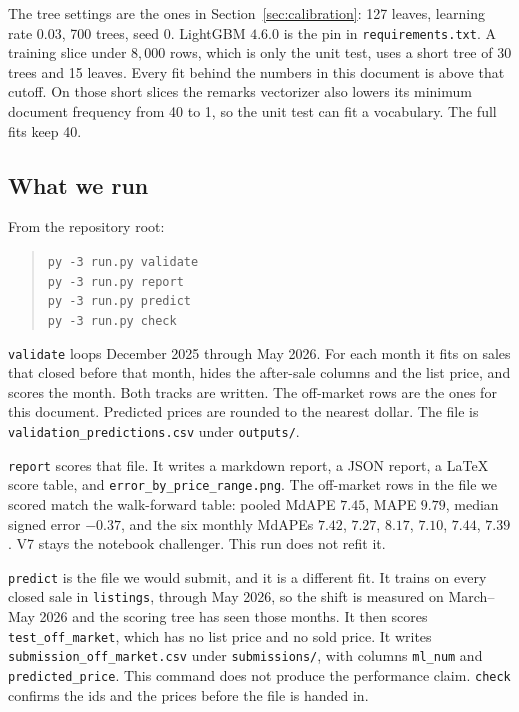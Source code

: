 \documentclass[11pt]{article}
\begin{document}
The tree settings are the ones in Section~\ref{sec:calibration}: 127 leaves, learning rate \(0.03\), 700 trees, seed \(0\). LightGBM \(4.6.0\) is the pin in \texttt{requirements.txt}. A training slice under \(8{,}000\) rows, which is only the unit test, uses a short tree of 30 trees and 15 leaves. Every fit behind the numbers in this document is above that cutoff. On those short slices the remarks vectorizer also lowers its minimum document frequency from 40 to 1, so the unit test can fit a vocabulary. The full fits keep 40.

\subsection{What we run}

From the repository root:

\begin{quote}
\texttt{py -3 run.py validate}\\
\texttt{py -3 run.py report}\\
\texttt{py -3 run.py predict}\\
\texttt{py -3 run.py check}
\end{quote}

\texttt{validate} loops December 2025 through May 2026. For each month it fits on sales that closed before that month, hides the after-sale columns and the list price, and scores the month. Both tracks are written. The off-market rows are the ones for this document. Predicted prices are rounded to the nearest dollar. The file is \texttt{validation\_predictions.csv} under \texttt{outputs/}.

\texttt{report} scores that file. It writes a markdown report, a JSON report, a LaTeX score table, and \texttt{error\_by\_price\_range.png}. The off-market rows in the file we scored match the walk-forward table: pooled MdAPE \(7.45\), MAPE \(9.79\), median signed error \(-0.37\), and the six monthly MdAPEs \(7.42\), \(7.27\), \(8.17\), \(7.10\), \(7.44\), \(7.39\). V7 stays the notebook challenger. This run does not refit it.

\texttt{predict} is the file we would submit, and it is a different fit. It trains on every closed sale in \texttt{listings}, through May 2026, so the shift is measured on March--May 2026 and the scoring tree has seen those months. It then scores \texttt{test\_off\_market}, which has no list price and no sold price. It writes \texttt{submission\_off\_market.csv} under \texttt{submissions/}, with columns \texttt{ml\_num} and \texttt{predicted\_price}. This command does not produce the performance claim. \texttt{check} confirms the ids and the prices before the file is handed in.
\end{document}
